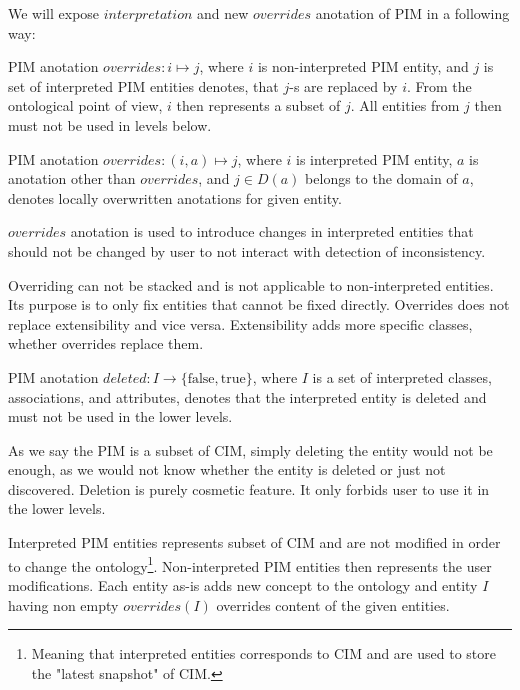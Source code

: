 \smallskip

We will expose $interpretation$ and new $overrides$ anotation of PIM in a following way:

\begin{definition}[overrides]
    PIM anotation $overrides: i \mapsto j$, where $i$ is non-interpreted PIM entity, and $j$ is set of interpreted PIM entities denotes, that $j$-s are replaced by $i$. From the ontological point of view, $i$ then represents a subset of $j$. All entities from $j$ then must not be used in levels below.
\end{definition}

\begin{definition}[overrides]
    PIM anotation $overrides: (i, a) \mapsto j$, where $i$ is interpreted PIM entity, $a$ is anotation other than $overrides$, and $j \in D(a)$ belongs to the domain of $a$, denotes locally overwritten anotations for given entity.
\end{definition}

$overrides$ anotation is used to introduce changes in interpreted entities that should not be changed by user to not interact with detection of inconsistency.

Overriding can not be stacked and is not applicable to non-interpreted entities. Its purpose is to only fix entities that cannot be fixed directly. Overrides does not replace extensibility and vice versa. Extensibility adds more specific classes, whether overrides replace them.

\begin{definition}[deleted]
    PIM anotation $deleted: I \rightarrow \{\textrm{false}, \textrm{true}\}$, where $I$ is a set of interpreted classes, associations, and attributes, denotes that the interpreted entity is deleted and must not be used in the lower levels.
\end{definition}

As we say the PIM is a subset of CIM, simply deleting the entity would not be enough, as we would not know whether the entity is deleted or just not discovered. Deletion is purely cosmetic feature. It only forbids user to use it in the lower levels.

\begin{notation}
    Interpreted PIM entities represents subset of CIM and are not modified in order to change the ontology\footnote{Meaning that interpreted entities corresponds to CIM and are used to store the "latest snapshot" of CIM.}. Non-interpreted PIM entities then represents the user modifications. Each entity as-is adds new concept to the ontology and entity $I$ having non empty $overrides(I)$ overrides content of the given entities.
\end{notation}

